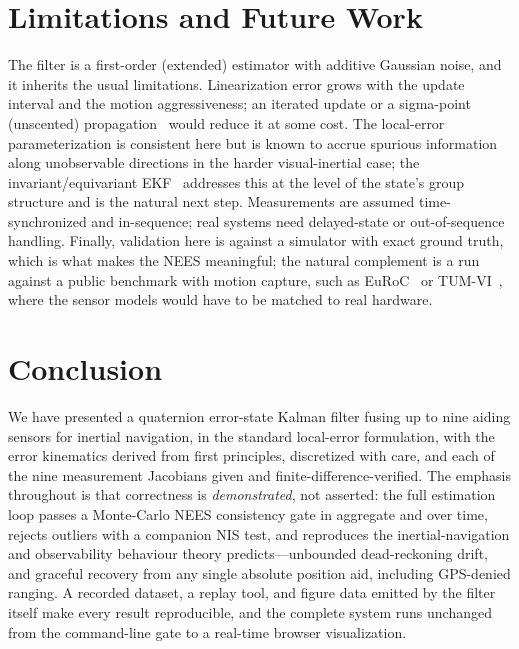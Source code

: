 \documentclass[11pt]{article}
\begin{document}
\section{Limitations and Future Work}
\label{sec:limits}

The filter is a first-order (extended) estimator with additive Gaussian noise, and it inherits the usual
limitations. Linearization error grows with the update interval and the motion aggressiveness; an
iterated update or a sigma-point (unscented) propagation~\cite{julier2004} would reduce it at some cost.
The local-error parameterization is consistent here but is known to accrue spurious information along
unobservable directions in the harder visual-inertial case; the invariant/equivariant
EKF~\cite{barrau2017} addresses this at the level of the state's group structure and is the natural next
step. Measurements are assumed time-synchronized and in-sequence; real systems need delayed-state or
out-of-sequence handling. Finally, validation here is against a simulator with exact ground truth, which
is what makes the NEES meaningful; the natural complement is a run against a public benchmark with motion
capture, such as EuRoC~\cite{burri2016} or TUM-VI~\cite{schubert2018}, where the sensor models would have
to be matched to real hardware.

\section{Conclusion}
\label{sec:conclusion}

We have presented a quaternion error-state Kalman filter fusing up to nine aiding sensors for inertial
navigation, in the standard local-error formulation, with the error kinematics derived from first
principles, discretized with care, and each of the nine measurement Jacobians given and
finite-difference-verified. The emphasis throughout is that correctness is \emph{demonstrated}, not
asserted: the full estimation loop passes a Monte-Carlo NEES consistency gate in aggregate and over
time, rejects outliers with a companion NIS test, and reproduces the inertial-navigation and
observability behaviour theory predicts---unbounded dead-reckoning drift, and graceful recovery from any
single absolute position aid, including GPS-denied ranging. A recorded dataset, a replay tool, and
figure data emitted by the filter itself make every result reproducible, and the complete system runs
unchanged from the command-line gate to a real-time browser visualization.

\appendix
\end{document}
